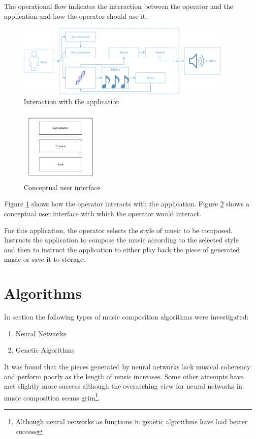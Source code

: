The operational flow indicates the interaction between the operator and the application and how the operator should use it.

\begin{figure}[ht]
\centerline{\includegraphics[width=400px]{../images/user_interaction.pdf}}
\caption{Interaction with the application}
\label{ims:interactionapp}
\end{figure}

\begin{figure}[ht]
\centerline{\includegraphics[width=150px]{../images/user_interface.pdf}}
\caption{Conceptual user interface}
\label{ims:conceptuserinterface}
\end{figure}

Figure \ref{ims:interactionapp} shows how the operator interacts with the application. Figure \ref{ims:conceptuserinterface} shows a conceptual user interface with which the operator would interact.

For this application, the operator selects the style of music to be composed. Instructs the application to compose the music according to the selected style and then to instruct the application to either play back the piece of generated music or save it to storage.

\chapter{Algorithms}
In section \label{chap:comp_algo} the following types of music composition algorithms were investigated:
\begin{enumerate}
\item Neural Networks
\item Genetic Algorithms
\end{enumerate}
It was found that the pieces generated by neural networks lack musical coherency and perform poorly as the length of music increases. Some other attempts have met slightly more success although the overarching view for neural networks in music composition seems grim\footnote{Although neural networks as functions in genetic algorithms have had better success}.

